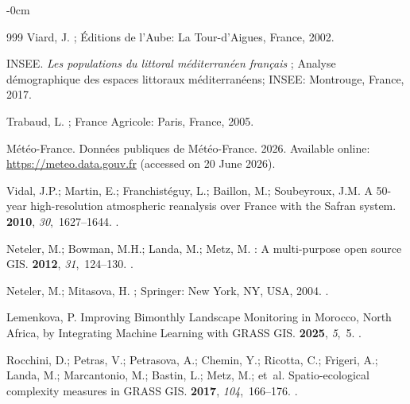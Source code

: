 \documentclass[coasts,article,accept,pdftex,moreauthors]{Definitions/mdpi}
\begin{document}
\begin{adjustwidth}{-\extralength}{0cm}
\begin{thebibliography}{999}
Viard, J.
; Éditions
  de l'Aube: La Tour-d'Aigues, France, 2002.

{INSEE}.
\newblock\textit{Les populations du littoral m\'editerran\'een fran\c{c}ais%
};  Analyse d\'emographique des espaces littoraux m\'editerran\'eens; INSEE: Montrouge, France, 2017.


Trabaud, L.
; France Agricole: Paris, France, 2005.

{M\'et\'eo-France}.
\newblock Donn\'ees publiques de M\'et\'eo-France. 2026. Available online:
\newblock \url{https://meteo.data.gouv.fr}  (accessed on 20 June 2026).


Vidal, J.P.; Martin, E.; Franchist\'eguy, L.; Baillon, M.; Soubeyroux, J.M.
\newblock A 50-year high-resolution atmospheric reanalysis over {France} with
  the {Safran} system.
 {\bf 2010}, {\em
  30},~1627--1644.
.

Neteler, M.; Bowman, M.H.; Landa, M.; Metz, M.
: A multi-purpose open source {GIS}.
 {\bf 2012}, {\em
  31},~124--130.
.

Neteler, M.; Mitasova, H.
; Springer: New York, NY, USA,
  2004.
.

Lemenkova, P.
\newblock Improving Bimonthly Landscape Monitoring in {Morocco}, {North
  Africa}, by Integrating Machine Learning with {GRASS GIS}.
 {\bf 2025}, {\em 5},~5.
.

Rocchini, D.; Petras, V.; Petrasova, A.; Chemin, Y.; Ricotta, C.; Frigeri, A.;
  Landa, M.; Marcantonio, M.; Bastin, L.; Metz, M.;  et~al.
\newblock Spatio-ecological complexity measures in GRASS GIS.
 {\bf 2017}, {\em 104},~166--176.
.


\end{thebibliography}
\end{adjustwidth}
\end{document}
